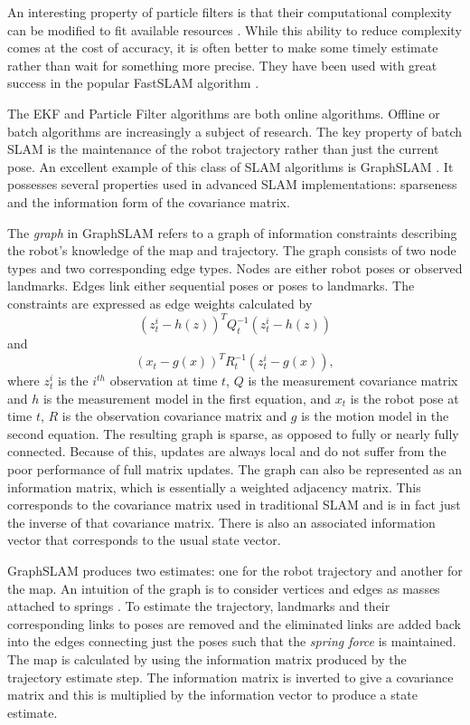 An interesting property of particle filters is that their computational complexity can be modified to fit available resources \cite{ThrunPR2005}.  While this ability to reduce complexity comes at the cost of accuracy, it is often better to make some timely estimate rather than wait for something more precise.  They have been used with great success in the popular FastSLAM algorithm \cite{montemerlo2003fastslam}.

The EKF and Particle Filter algorithms are both online algorithms.  Offline or batch algorithms are increasingly a subject of research.  The key property of batch SLAM is the maintenance of the robot trajectory rather than just the current pose.   An excellent example of this class of SLAM algorithms is GraphSLAM \cite{Thrun05GS}.  It possesses several properties used in advanced SLAM implementations: sparseness and the information form of the covariance matrix.

The \emph{graph} in GraphSLAM refers to a graph of information constraints describing the robot's knowledge of the map and trajectory.  The graph consists of two node types and two corresponding edge types.  Nodes are either robot poses or observed landmarks.  Edges link either sequential poses or poses to landmarks.  The constraints are expressed as edge weights calculated by 
\begin{equation}\label{constraint1}
(z_{t}^{i} - h(z))^TQ_{t}^{-1}(z_{t}^{i} - h(z)) 
\end{equation}
and 
\begin{equation}\label{constraint2}
(x_{t} - g(x))^TR_{t}^{-1}(z_{t}^{i} - g(x)),
\end{equation}
 where $z_t^i$ is the $i^{th}$ observation at time $t$, $Q$ is the measurement covariance matrix and $h$ is the measurement model in the first equation, and $x_{t}$ is the robot pose at time $t$, $R$ is the observation covariance matrix and $g$ is the motion model in the second equation.  The resulting graph is sparse, as opposed to fully or nearly fully connected.  Because of this, updates are always local and do not suffer from the poor performance of full matrix updates.  The graph can also be represented as an information matrix, which is essentially a weighted adjacency matrix.  This corresponds to the covariance matrix used in traditional SLAM and is in fact just the inverse of that covariance matrix.  There is also an associated information vector that corresponds to the usual state vector.  

GraphSLAM produces two estimates: one for the robot trajectory and another for the map.  An intuition of the graph is to consider vertices and edges as masses attached to springs \cite{Thrun05GS}.  To estimate the trajectory, landmarks and their corresponding links to poses are removed and the eliminated links are added back into the edges connecting just the poses such that the \emph{spring force} is maintained.  The map is calculated by using the information matrix produced by the trajectory estimate step.  The information matrix is inverted to give a covariance matrix and this is multiplied by the information vector to produce a state estimate.  

